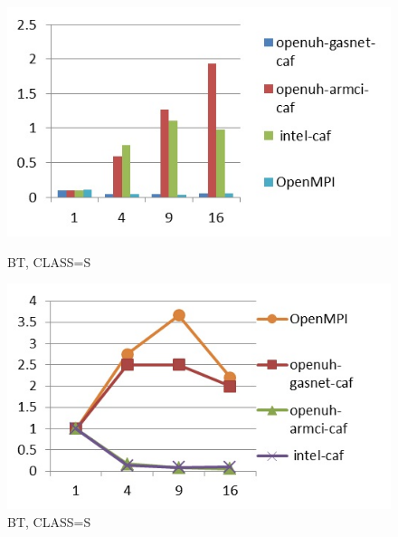 \begin{figure}[ht]
\begin{minipage}[b]{0.45\linewidth}
\centering
\includegraphics[width=\textwidth]{./figures/bt_S_time.jpg}
\caption{BT, CLASS=S}
\label{fig:figure1}
\end{minipage}
\hspace{0.5cm}
\begin{minipage}[b]{0.45\linewidth}
\centering
\includegraphics[width=\textwidth]{./figures/bt_S_scalability.jpg}
\caption{BT, CLASS=S}
\label{fig:figure2}
\end{minipage}
\end{figure}



